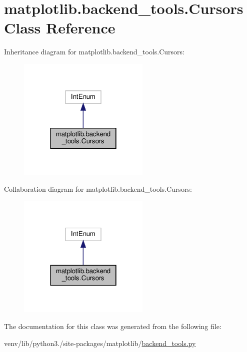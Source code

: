 \hypertarget{classmatplotlib_1_1backend__tools_1_1Cursors}{}\section{matplotlib.\+backend\+\_\+tools.\+Cursors Class Reference}
\label{classmatplotlib_1_1backend__tools_1_1Cursors}


Inheritance diagram for matplotlib.\+backend\+\_\+tools.\+Cursors\+:
\nopagebreak
\begin{figure}[H]
\begin{center}
\leavevmode
\includegraphics[width=178pt]{classmatplotlib_1_1backend__tools_1_1Cursors__inherit__graph}
\end{center}
\end{figure}


Collaboration diagram for matplotlib.\+backend\+\_\+tools.\+Cursors\+:
\nopagebreak
\begin{figure}[H]
\begin{center}
\leavevmode
\includegraphics[width=178pt]{classmatplotlib_1_1backend__tools_1_1Cursors__coll__graph}
\end{center}
\end{figure}


The documentation for this class was generated from the following file\+:\begin{DoxyCompactItemize}
\item 
venv/lib/python3./site-\/packages/matplotlib/\hyperlink{backend__tools_8py}{backend\+\_\+tools.\+py}\end{DoxyCompactItemize}
